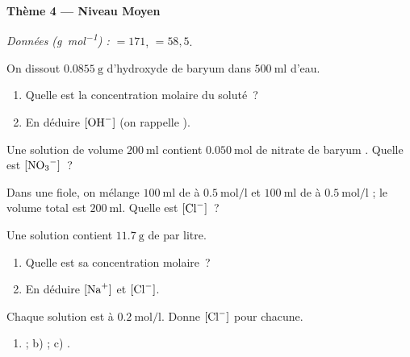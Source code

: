 \documentclass[11pt,a4paper]{article}
\begin{document}
\begin{center}{\large\bfseries\color{primarydark} Thème 4 — Niveau Moyen}\end{center}
\emph{Données (\si{\gram\per\mole}) :} $=171$, $=58{,}5$.

\begin{exo}
On dissout $\SI{0.0855}{\gram}$ d'hydroxyde de baryum  dans $\SI{500}{\milli\litre}$ d'eau.
\begin{enumerate}[label=\alph*)]
  \item Quelle est la concentration molaire du soluté~?
  \item En déduire $[\ce{OH-}]$ (on rappelle ).
\end{enumerate}
\end{exo}

\begin{exo}
Une solution de volume $\SI{200}{\milli\litre}$ contient $\SI{0.050}{\mole}$ de nitrate de baryum
. Quelle est $[\ce{NO3-}]$~?
\end{exo}

\begin{exo}
Dans une fiole, on mélange $\SI{100}{\milli\litre}$ de  à $\SI{0.5}{\mole\per\litre}$ et
$\SI{100}{\milli\litre}$ de  à $\SI{0.5}{\mole\per\litre}$ ; le volume total est
$\SI{200}{\milli\litre}$. Quelle est $[\ce{Cl-}]$~?
\end{exo}

\begin{exo}
Une solution contient $\SI{11.7}{\gram}$ de  par litre.
\begin{enumerate}[label=\alph*)]
  \item Quelle est sa concentration molaire~?
  \item En déduire $[\ce{Na+}]$ et $[\ce{Cl-}]$.
\end{enumerate}
\end{exo}

\begin{exo}
Chaque solution est à $\SI{0.2}{\mole\per\litre}$. Donne $[\ce{Cl-}]$ pour chacune.
\begin{enumerate}[label=\alph*)]
  \item {} ; \quad b)  ; \quad c) .
\end{enumerate}
\end{exo}
\end{document}
